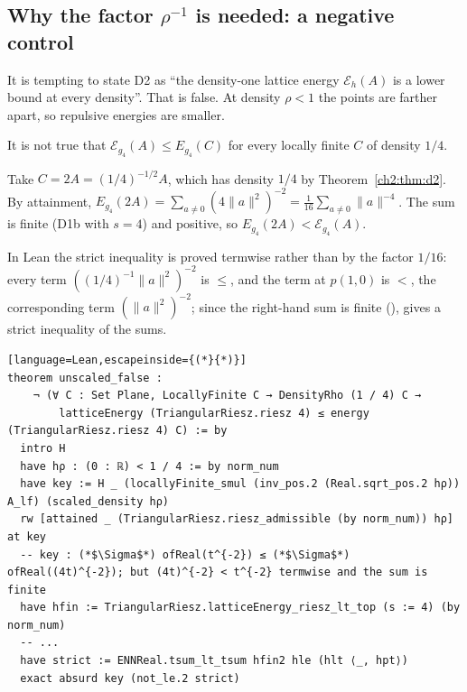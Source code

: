 \subsection{Why the factor $\rho^{-1}$ is needed: a negative control}

It is tempting to state D2 as ``the density-one lattice energy $\mathcal{E}_h(A)$ is a lower bound at every density''.
That is false. At density $\rho<1$ the points are farther apart, so repulsive energies are smaller.

\begin{proposition}\label{ch2:prop:unscaled}
It is not true that $\mathcal{E}_{g_4}(A)\le E_{g_4}(C)$ for every locally finite $C$ of density $1/4$.
\end{proposition}
\begin{humanproof}
Take $C=2A=(1/4)^{-1/2}A$, which has density $1/4$ by Theorem~\ref{ch2:thm:d2}. By attainment,
$E_{g_4}(2A)=\sum_{a\neq0}(4\|a\|^2)^{-2}=\tfrac1{16}\sum_{a\ne0}\|a\|^{-4}$. The sum is finite (D1b with $s=4$) and
positive, so $E_{g_4}(2A)<\mathcal{E}_{g_4}(A)$.
\end{humanproof}

In Lean the strict inequality is proved termwise rather than by the factor $1/16$: every term
$((1/4)^{-1}\|a\|^2)^{-2}$ is $\le$, and the term at $p(1,0)$ is $<$, the corresponding term $(\|a\|^2)^{-2}$; since the
right-hand sum is finite (),  gives a strict inequality of
the sums.
\begin{leanbox}
\begin{lstlisting}[language=Lean,escapeinside={(*}{*)}]
theorem unscaled_false :
    ¬ (∀ C : Set Plane, LocallyFinite C → DensityRho (1 / 4) C →
        latticeEnergy (TriangularRiesz.riesz 4) ≤ energy (TriangularRiesz.riesz 4) C) := by
  intro H
  have hρ : (0 : ℝ) < 1 / 4 := by norm_num
  have key := H _ (locallyFinite_smul (inv_pos.2 (Real.sqrt_pos.2 hρ)) A_lf) (scaled_density hρ)
  rw [attained _ (TriangularRiesz.riesz_admissible (by norm_num)) hρ] at key
  -- key : (*$\Sigma$*) ofReal(t^{-2}) ≤ (*$\Sigma$*) ofReal((4t)^{-2}); but (4t)^{-2} < t^{-2} termwise and the sum is finite
  have hfin := TriangularRiesz.latticeEnergy_riesz_lt_top (s := 4) (by norm_num)
  -- ...
  have strict := ENNReal.tsum_lt_tsum hfin2 hle (hlt ⟨_, hpt⟩)
  exact absurd key (not_le.2 strict)
\end{lstlisting}
\end{leanbox}

